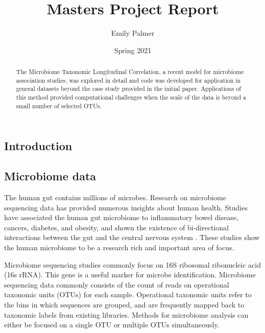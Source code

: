 \documentclass[12pt]{article}
\title{Masters Project Report}
\author{Emily Palmer}
\date{Spring 2021}
\begin{document}
\maketitle

\begin{abstract}
  The Microbiome Taxonomic Longitudinal Correlation, a recent model for microbiome association studies, was explored in detail and code was developed for application in general datasets beyond the case study provided in the initial paper. Applications of this method provided computational challenges when the scale of the data is beyond a small number of selected OTUs.
\end{abstract}



\begin{singlespace}
\section{Introduction}
\end{singlespace}

\subsection{Microbiome data}
The human gut contains millions of microbes. Research on microbiome sequencing data has provided numerous insights about human health. Studies have associated the human gut microbiome to inflammatory bowel disease, cancers, diabetes, and obesity, and shown the existence of bi-directional interactions between the gut and the central nervous system \cite{kinross2008human, mayer2015gut}. These studies show the human microbiome to be a research rich and important area of focus.


Microbiome sequencing studies commonly focus on 16S ribosomal ribonucleic acid (16s rRNA). This gene is a useful marker for microbe identification. Microbiome sequencing data commonly consists of the count of reads on operational taxonomic units (OTUs) for each sample. Operational taxonomic units refer to the bins in which sequences are grouped, and are frequently mapped back to taxonomic labels from existing libraries. Methods for microbiome analysis can either be focused on a single OTU or multiple OTUs simultaneously.
\end{document}
